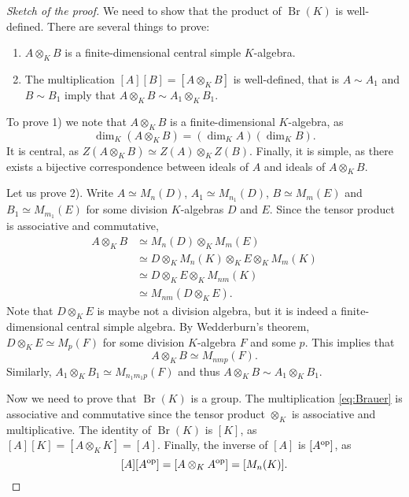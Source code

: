 \begin{proof}[Sketch of the proof]
    We need to show that the product of $\operatorname{Br}(K)$ is well-defined. There are several
    things to prove:
    \begin{enumerate}
        \item $A\otimes_KB$ is a finite-dimensional central simple $K$-algebra.  
        \item The multiplication $[A][B]=[A\otimes_KB]$ is well-defined, that is $A\sim A_1$ and $B\sim B_1$ imply 
        that $A\otimes_KB\sim A_1\otimes_KB_1$. 
    \end{enumerate}
    To prove 1) we note that $A\otimes_KB$ is a finite-dimensional $K$-algebra, as 
    \[
    \dim_K(A\otimes_KB)=(\dim_KA)(\dim_KB).
    \]
    It is central, as 
    $Z(A\otimes_KB)\simeq Z(A)\otimes_KZ(B)$. Finally, it is simple, as 
    there exists a bijective correspondence between ideals of $A$ and 
    ideals of $A\otimes_KB$. 
    
    Let us prove 2). Write $A\simeq M_n(D)$, $A_1\simeq M_{n_1}(D)$, $B\simeq M_{m}(E)$ and
    $B_1\simeq M_{m_1}(E)$ for some division $K$-algebras $D$ and $E$. Since the
    tensor product is associative and commutative, 
    \begin{align*}
        A\otimes_KB &\simeq M_n(D)\otimes_KM_m(E)\\
        &\simeq D\otimes_KM_n(K)\otimes_KE\otimes_KM_m(K)\\
        &\simeq D\otimes_KE\otimes_KM_{nm}(K)\\
        &\simeq M_{nm}(D\otimes_KE).
    \end{align*}
    Note that $D\otimes_KE$ is maybe not a division algebra, but it is indeed
    a finite-dimensional central simple algebra. By Wedderburn's theorem, 
    $D\otimes_KE\simeq M_p(F)$ for some division $K$-algebra $F$ and some $p$. This implies that
    \[
    A\otimes_KB\simeq M_{nmp}(F).
    \]
    Similarly, $A_1\otimes_KB_1\simeq M_{n_1m_1p}(F)$ and thus $A\otimes_KB\sim A_1\otimes_KB_1$. 
    
    Now we need to prove that $\operatorname{Br}(K)$ is a group. The multiplication \eqref{eq:Brauer}
    is associative and commutative since the tensor product $\otimes_K$ is associative 
    and multiplicative. The identity of $\operatorname{Br}(K)$ is
    $[K]$, as $[A][K]=[A\otimes_KK]=[A]$. Finally, the inverse of $[A]$ is $[A^{\operatorname{op}}]$, as 
    \[
    [A][A^{\operatorname{op}}]=[A\otimes_KA^{\operatorname{op}}]=[M_n(K)].\qedhere
    \]
\end{proof}

